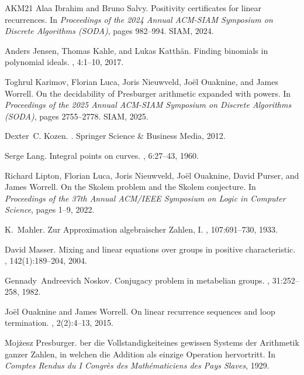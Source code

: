\documentclass[letterpaper, 11pt, thm-restate]{article}
\numberwithin{equation}{section}
\theoremstyle{definition}
\theoremstyle{definition}
\theoremstyle{definition}
\begin{document}
\begin{thebibliography}{AKM{\etalchar{+}}21}
Alaa Ibrahim and Bruno Salvy.
\newblock Positivity certificates for linear recurrences.
\newblock In {\em Proceedings of the 2024 Annual ACM-SIAM Symposium on Discrete Algorithms (SODA)}, pages 982--994. SIAM, 2024.

Anders Jensen, Thomas Kahle, and Lukas Katth{\"a}n.
\newblock Finding binomials in polynomial ideals.
, 4:1--10, 2017.

Toghrul Karimov, Florian Luca, Joris Nieuwveld, Jo{\"e}l Ouaknine, and James Worrell.
\newblock On the decidability of {P}resburger arithmetic expanded with powers.
\newblock In {\em Proceedings of the 2025 Annual ACM-SIAM Symposium on Discrete Algorithms (SODA)}, pages 2755--2778. SIAM, 2025.

Dexter~C. Kozen.
.
\newblock Springer Science \& Business Media, 2012.

Serge Lang.
\newblock Integral points on curves.
, 6:27--43, 1960.

Richard Lipton, Florian Luca, Joris Nieuwveld, Jo{\"e}l Ouaknine, David Purser, and James Worrell.
\newblock On the {S}kolem problem and the {S}kolem conjecture.
\newblock In {\em Proceedings of the 37th Annual ACM/IEEE Symposium on Logic in Computer Science}, pages 1--9, 2022.

K.~Mahler.
\newblock Zur {A}pproximation algebraischer {Z}ahlen, {I}.
, 107:691–730, 1933.

David Masser.
\newblock Mixing and linear equations over groups in positive characteristic.
, 142(1):189--204, 2004.

Gennady~Andreevich Noskov.
\newblock Conjugacy problem in metabelian groups.
, 31:252--258, 1982.

Jo{\"e}l Ouaknine and James Worrell.
\newblock On linear recurrence sequences and loop termination.
, 2(2):4--13, 2015.

Moj\.{z}esz Presburger.
ber die {V}ollstandigkeiteines gewissen {S}ystems der {A}rithmetik ganzer {Z}ahlen, in welchen die {A}ddition als einzige {O}peration hervortritt.
\newblock In {\em Comptes Rendus du I Congrès des Mathématiciens des Pays Slaves}, 1929.


\end{thebibliography}
\end{document}
